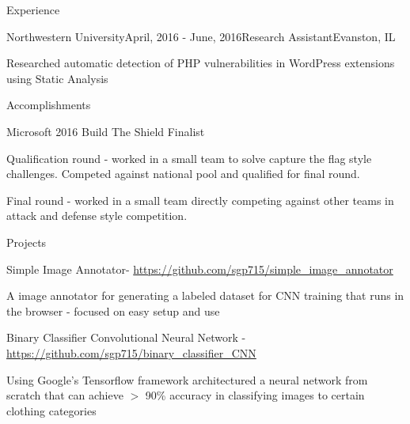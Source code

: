 \documentclass{resume} %
\begin{document}
\begin{rSection}{Experience}

\begin{rSubsection}{Northwestern University}{April, 2016 - June, 2016}{Research Assistant}{Evanston, IL}
\item Researched automatic detection of PHP vulnerabilities in WordPress extensions using Static
Analysis
\end{rSubsection}

\end{rSection}


\begin{rSection}{Accomplishments}

\begin{oSubsection}{Microsoft 2016 Build The Shield Finalist}
	\item Qualification round - worked in a small team to solve capture the flag style challenges. Competed against national pool and qualified for final round.
	\item Final round - worked in a small team directly competing against other teams in attack and defense style competition.
\end{oSubsection}

\end{rSection}


\begin{rSection}{Projects}


\begin{oSubsection}{Simple Image Annotator- \url{https://github.com/sgp715/simple_image_annotator}}
	\item A image annotator for generating a labeled dataset for CNN training that runs in the browser - focused on easy setup and use
\end{oSubsection}
\begin{oSubsection}{Binary Classifier Convolutional Neural Network - \url{https://github.com/sgp715/binary_classifier_CNN}}
	\item Using Google's Tensorflow framework architectured a neural network from scratch that can achieve $>$ 90\% accuracy in classifying images to certain clothing categories
\end{oSubsection}

\end{rSection}
\end{document}
